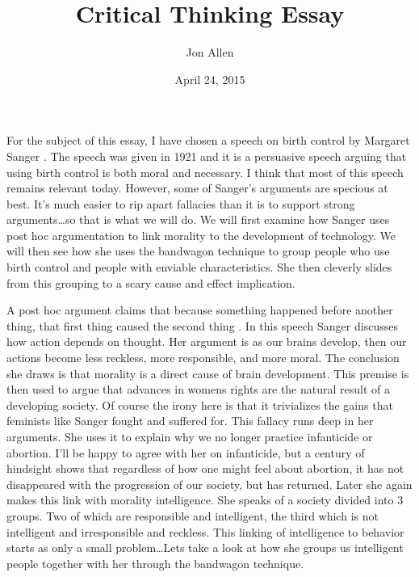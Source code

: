 \documentclass[letterpaper,12pt]{article}
\begin{document}
\title{Critical Thinking Essay}
\date{April 24, 2015}
\author{Jon Allen}
\maketitle
\doublespacing
\renewcommand{\labelenumi}{\Roman{enumi}}
\renewcommand{\labelenumii}{\Alph{enumii}.}

For the subject of this essay, I have chosen a speech on birth control by Margaret Sanger \cite{speech}. The speech was given in 1921 and it is a persuasive speech arguing that using birth control is both moral and necessary. I think that most of this speech remains relevant today. However, some of Sanger's arguments are specious at best. It's much easier to rip apart fallacies than it is to support strong arguments\dots so that is what we will do. We will first examine how Sanger uses post hoc argumentation to link morality to the development of technology. We will then see how she uses the bandwagon technique to group people who use birth control and people with enviable characteristics. She then cleverly slides from this grouping to a scary cause and effect implication.

A post hoc argument claims that because something happened before another thing, that first thing caused the second thing \cite{text}. In this speech Sanger discusses how action depends on thought. Her argument is as our brains develop, then our actions become less reckless, more responsible, and more moral. The conclusion she draws is that morality  is a direct cause of brain development. This premise is then used to argue that advances in womens rights are the natural result of a developing society. Of course the irony here is that it trivializes the gains that feminists like Sanger fought and suffered for. This fallacy runs deep in her arguments. She uses it to explain why we no longer practice infanticide or abortion. I'll be happy to agree with her on infanticide, but a century of hindsight shows that regardless of how one might feel about abortion, it has not disappeared with the progression of our society, but has returned. Later she again makes this link with morality intelligence. She speaks of a society divided into 3 groups. Two of which are responsible and intelligent, the third which is not intelligent and irresponsible and reckless. This linking of intelligence to behavior starts as only a small problem\dots Lets take a look at how she groups us intelligent people together with her through the bandwagon technique.
\end{document}

